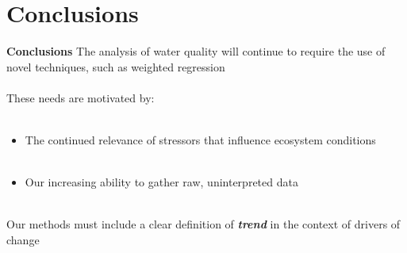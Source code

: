 \documentclass[serif]{beamer}\usepackage[]{graphicx}\usepackage[]{color}
\newcommand{\emtxt}[1]{\textbf{\textit{#1}}}
\begin{document}
\section{Conclusions}

\begin{frame}{\textbf{Conclusions}}
The analysis of water quality will continue to require the use of novel techniques, such as weighted regression\\~\\
These needs are motivated by: \\~\\
\begin{itemize}
\item The continued relevance of stressors that influence ecosystem conditions \\~\\
\item Our increasing ability to gather raw, uninterpreted data \\~\\
\end{itemize}
Our methods must include a clear definition of \emtxt{trend} in the context of drivers of change
\end{frame}
\end{document}
